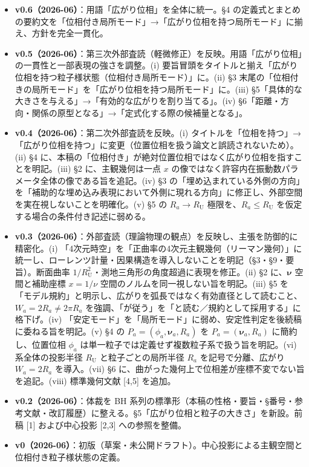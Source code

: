\documentclass[
]{ltjsarticle}
\begin{document}
\begin{itemize}
\item
  \textbf{v0.6（2026-06）}：用語「広がり位相」を全体に統一。§4
  の定義式とまとめの要約文を「位相付き局所モード」→「広がり位相を持つ局所モード」に揃え、方針を完全一貫化。
\item
  \textbf{v0.5（2026-06）}：第三次外部査読（軽微修正）を反映。用語「広がり位相」の一貫性と一部表現の強さを調整。(i)
  要旨冒頭をタイトルと揃え「広がり位相を持つ粒子様状態（位相付き局所モード）」に。(ii)
  §3
  末尾の「位相付きの局所モード」を「広がり位相を持つ局所モード」に。(iii)
  §5「具体的な大きさを与える」→「有効的な広がりを割り当てる」。(iv)
  §6「距離・方向・関係の原型となる」→「定式化する際の候補量となる」。
\item
  \textbf{v0.4（2026-06）}：第二次外部査読を反映。(i)
  タイトルを「位相を持つ」→「広がり位相を持つ」に変更（位置位相を扱う論文と誤読されないため）。(ii)
  §4
  に、本稿の「位相付き」が絶対位置位相ではなく広がり位相を指すことを明記。(iii)
  §2 に、主観幾何は一点 \(x\)
  の像ではなく許容内在振動数パラメータ全体の像である旨を追記。(iv) §3
  の「埋め込まれている外側の方向」を「補助的な埋め込み表現において外側に現れる方向」に修正し、外部空間を実在視しないことを明確化。(v)
  §5 の \(R_a\to R_{\mathrm U}\) 極限を、\(R_a\le R_{\mathrm U}\)
  を仮定する場合の条件付き記述に弱める。
\item
  \textbf{v0.3（2026-06）}：外部査読（理論物理の観点）を反映し、主張を防御的に精密化。(i)
  「4次元時空」を「正曲率の4次元主観幾何（リーマン幾何）」に統一し、ローレンツ計量・因果構造を導入しないことを明記（§3・§9・要旨）。断面曲率
  \(1/R_{\mathrm U}^2\)・測地三角形の角度超過に表現を修正。(ii) §2
  に、\(\boldsymbol{\nu}\) 空間と補助座標 \(x=1/\nu\)
  空間のノルムを同一視しない旨を明記。(iii) §5
  を「モデル規約」と明示し、広がりを弧長ではなく有効直径として読むこと、\(W_a=2R_a\neq2\pi R_a\)
  を強調、「が従う」を「と読む／規約として採用する」に格下げ。(iv)
  「安定モード」を「局所モード」に弱め、安定性判定を後続稿に委ねる旨を明記。(v)
  §4 の \(P_a=(\phi_a,\boldsymbol{\nu}_a,R_a)\) を
  \(P_a=(\boldsymbol{\nu}_a,R_a)\) に簡約し、位置位相 \(\phi_a\)
  は単一粒子では定義せず複数粒子系で扱う旨を明記。(vi) 系全体の投影半径
  \(R_{\mathrm U}\) と粒子ごとの局所半径 \(R_a\) を記号で分離、広がり
  \(W_a=2R_a\) を導入。(vii) §6
  に、曲がった幾何上で位相差が座標不変でない旨を追記。(viii)
  標準幾何文献 {[}4,5{]} を追加。
\item
  \textbf{v0.2（2026-06）}：体裁を BH
  系列の標準形（本稿の性格・要旨・§番号・参考文献・改訂履歴）に整える。§5「広がり位相と粒子の大きさ」を新設。前稿
  {[}1{]} および中心投影 {[}2,3{]} への参照を整備。
\item
  \textbf{v0（2026-06）}：初版（草案・未公開ドラフト）。中心投影による主観空間と位相付き粒子様状態の定義。
\end{itemize}
\end{document}
